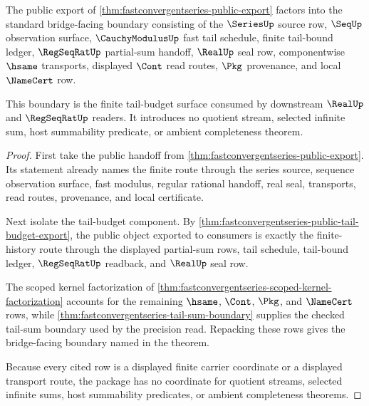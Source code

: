 \begin{theorem}
\label{thm:fast-convergent-series-bridge-boundary-package}
The public export of \autoref{thm:fastconvergentseries-public-export} factors into the standard bridge-facing boundary consisting of the $\SeriesUp$ source row, $\SeqUp$ observation surface, $\CauchyModulusUp$ fast tail schedule, finite tail-bound ledger, $\RegSeqRatUp$ partial-sum handoff, $\RealUp$ seal row, componentwise $\hsame$ transports, displayed $\Cont$ read routes, $\Pkg$ provenance, and local $\NameCert$ row.

This boundary is the finite tail-budget surface consumed by downstream $\RealUp$ and $\RegSeqRatUp$ readers. It introduces no quotient stream, selected infinite sum, host summability predicate, or ambient completeness theorem.
\end{theorem}
\begin{proof}
First take the public handoff from \autoref{thm:fastconvergentseries-public-export}. Its statement already names the finite route through the series source, sequence observation surface, fast modulus, regular rational handoff, real seal, transports, read routes, provenance, and local certificate.

Next isolate the tail-budget component. By \autoref{thm:fastconvergentseries-public-tail-budget-export}, the public object exported to consumers is exactly the finite-history route through the displayed partial-sum rows, tail schedule, tail-bound ledger, $\RegSeqRatUp$ readback, and $\RealUp$ seal row.

The scoped kernel factorization of \autoref{thm:fastconvergentseries-scoped-kernel-factorization} accounts for the remaining $\hsame$, $\Cont$, $\Pkg$, and $\NameCert$ rows, while \autoref{thm:fastconvergentseries-tail-sum-boundary} supplies the checked tail-sum boundary used by the precision read. Repacking these rows gives the bridge-facing boundary named in the theorem.

Because every cited row is a displayed finite carrier coordinate or a displayed transport route, the package has no coordinate for quotient streams, selected infinite sums, host summability predicates, or ambient completeness theorems.
\end{proof}

